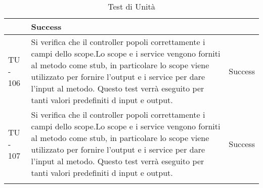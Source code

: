 \begin{center}
\begin{longtable}{ | p{3cm} | p{9cm} | p{2cm} | }
 & Success \\ \hline
TU - 106 & Si verifica che il controller popoli correttamente i campi dello scope.Lo scope e i service vengono forniti al metodo come stub, in particolare lo scope viene utilizzato per fornire l'output e i service per dare l'input al metodo. Questo test verrà eseguito per tanti valori predefiniti d input e output. & Success \\ \hline
TU - 107 & Si verifica che il controller popoli correttamente i campi dello scope.Lo scope e i service vengono forniti al metodo come stub, in particolare lo scope viene utilizzato per fornire l'output e i service per dare l'input al metodo. Questo test verrà eseguito per tanti valori predefiniti d input e output. & Success \\ \hline
\caption{Test di Unità}
\end{longtable}
\egroup
\end{center}
